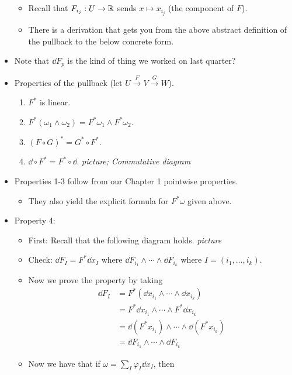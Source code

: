 \documentclass[../notes.tex]{subfiles}
\begin{document}
\begin{itemize}
\begin{itemize}
        \item Recall that $F_{i_j}:U\to\mathbb{R}$ sends $x\mapsto x_{i_j}$ (the component of $F$).
        \item There is a derivation that gets you from the above abstract definition of the pullback to the below concrete form.
    \end{itemize}
    \item Note that $\dd{F_p}$ is the kind of thing we worked on last quarter?
    \item Properties of the pullback (let $U\xrightarrow{F}V\xrightarrow{G}W$).
    \begin{enumerate}
        \item $F^*$ is linear.
        \item $F^*(\omega_1\wedge\omega_2)=F^*\omega_1\wedge F^*\omega_2$.
        \item $(F\circ G)^*=G^*\circ F^*$.
        \item $\dd\circ F^*=F^*\circ\dd$.
        \emph{picture; Commutative diagram}
    \end{enumerate}
    \item Properties 1-3 follow from our Chapter 1 pointwise properties.
    \begin{itemize}
        \item They also yield the explicit formula for $F^*\omega$ given above.
    \end{itemize}
    \item Property 4:
    \begin{itemize}
        \item First: Recall that the following diagram holds.
        \emph{picture}
        \item Check: $\dd{F_I}=F^*\dd{x_I}$ where $\dd{F_{i_1}}\wedge\cdots\wedge\dd{F_{i_k}}$ where $I=(i_1,\dots,i_k)$.
        \item Now we prove the property by taking
        \begin{align*}
            \dd{F_I} &= F^*(\dd{x_{i_1}}\wedge\cdots\wedge\dd{x_{i_k}})\\
            &= F^*\dd{x_{i_1}}\wedge\cdots\wedge F^*\dd{x_{i_k}}\tag*{Property 2}\\
            &= \dd(F^*x_{i_1})\wedge\cdots\wedge\dd{(F^*x_{i_k})}\\
            &= \dd{F_{i_1}}\wedge\cdots\wedge\dd{F_{i_k}}
        \end{align*}
        \item Now we have that if $\omega=\sum_I\varphi_I\dd{x_I}$, then

\end{itemize}
\end{itemize}
\end{document}
